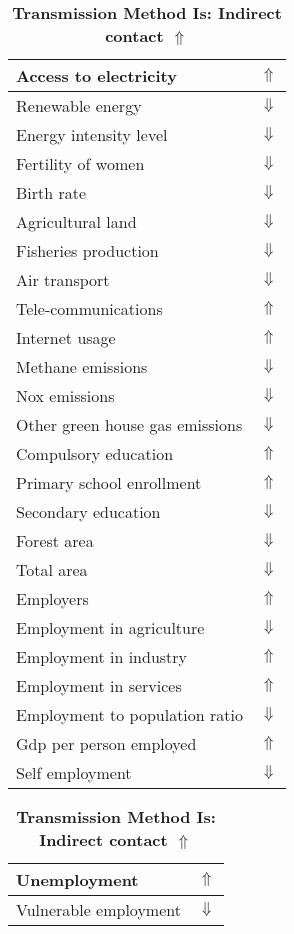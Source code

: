 \documentclass[12pt,notitlepage,oneside]{report}
\begin{document}
\begin{table}[!htb]
\caption{\textbf{Transmission Method Is: Indirect contact $\Uparrow$}}
\centering
\label{Correlated Socio-economic Factors0}
\begin{tabular}{|l|l|}
\hline
Access to electricity & $\Uparrow$\\ \hline
Renewable energy & $\Downarrow$\\ \hline
Energy intensity level & $\Downarrow$\\ \hline
Fertility of women & $\Downarrow$\\ \hline
Birth rate & $\Downarrow$\\ \hline
Agricultural land & $\Downarrow$\\ \hline
Fisheries production & $\Downarrow$\\ \hline
Air transport  & $\Downarrow$\\ \hline
Tele-communications & $\Uparrow$\\ \hline
Internet usage & $\Uparrow$\\ \hline
Methane emissions & $\Downarrow$\\ \hline
Nox emissions & $\Downarrow$\\ \hline
Other green house gas emissions & $\Downarrow$\\ \hline
Compulsory education & $\Uparrow$\\ \hline
Primary school enrollment & $\Uparrow$\\ \hline
Secondary education & $\Downarrow$\\ \hline
Forest area & $\Downarrow$\\ \hline
Total area & $\Downarrow$\\ \hline
Employers & $\Uparrow$\\ \hline
Employment in agriculture & $\Downarrow$\\ \hline
Employment in industry & $\Uparrow$\\ \hline
Employment in services & $\Uparrow$\\ \hline
Employment to population ratio & $\Downarrow$\\ \hline
Gdp per person employed & $\Uparrow$\\ \hline
Self employment & $\Downarrow$\\ \hline
\end{tabular}
\begin{tabular}{|l|l|}
\hline
Unemployment & $\Uparrow$\\ \hline
Vulnerable employment & $\Downarrow$\\ \hline

\end{tabular}
\end{table}
\end{document}
